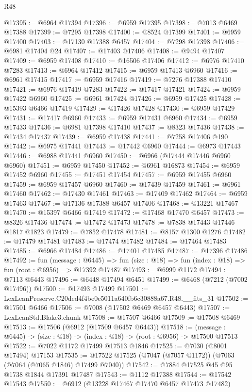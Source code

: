 \begin{lexlean}{R48}
\begin{coremodule}
@17395 := @6964 @17394
@17396 := @6959 @17395
@17398 := @7013 @6469 @17388
@17399 := @7295 @17398
@17400 := @8524 @17399
@17401 := @6959 @17400
@17403 := @17130 @17388 @6457
@17404 := @7298 @17398
@17406 := @6981 @17404 @24
@17407 := @17403 @17406
@17408 := @9494 @17407
@17409 := @6959 @17408
@17410 := @16506 @17406
@17412 := @6976 @17410 @7283
@17413 := @6964 @17412
@17415 := @6959 @17413 @6960
@17416 := @6961 @17415
@17417 := @6959 @17416
@17419 := @7276 @17388 @17410
@17421 := @6976 @17419 @7283
@17422 := @17417 @17421
@17424 := @6959 @17422 @6960
@17425 := @6961 @17424
@17426 := @6959 @17425
@17428 := @15393 @6466 @17419
@17429 := @17426 @17428
@17430 := @6959 @17429
@17431 := @17417 @6960
@17433 := @6959 @17431 @6960
@17434 := @6959 @17433
@17436 := @6981 @17398 @17410
@17437 := @8323 @17436
@17438 := @17434 @17437
@17439 := @6959 @17438
@17441 := @7258 @17406 @190
@17442 := @6975 @17441
@17443 := @17442 @6960
@17444 := @6973 @17443
@17446 := @6988 @17441 @6960
@17450 := @6966 (@17444 @17446 @6960 @6960)
@17451 := @6959 @17450
@17452 := @6961 @16873
@17454 := @6959 @17452 @6960
@17455 := @17451 @17454
@17457 := @6959 @17455 @6960
@17459 := @6959 @17457 @6960
@17460 := @17439 @17459
@17461 := @6961 @17460
@17462 := @17430 @17461
@17463 := @17409 @17462
@17464 := @6959 @17463
@17467 := @17136 @17388 @6457 @17406
@17468 := @13221 @17467
@17470 := @15397 @6466 @17419
@17472 := @17468 @17470 @6457
@17473 := @8326 @17436
@17474 := @17472 @17473
@17478 := @7838 @17443 @17446 @1817 @1823
@17479 := @7852 @17478
@17481 := @8157 @1300 @1276
@17482 := @17479 @17481
@17483 := @17474 @17482
@17484 := @17464 @17483
@17485 := @6966 @17484
@17486 := @17401 @17485
@17487 := @17396 @17486
@17492 := fun (message : @6445) =>
  fun (size : @18) => fun (index : @18) => fun (root : @6956) => @17392 @17487
@17493 := @6999 @1172
@17494 := @7113 @6443
@17496 := @6448 @17494 @6451
@17499 := @6468 (@7212 (@7002 @17496))
@17500 := @17493 @17499
@17501 := LexLeanPreserve.C20ded4f4be0e5011a640fb6c30888a67.R48.__fits_31
@17502 := @17501 @6466
@17506 := @7008 (@17502 @6469 @6457 @6443)
@17507 := LexLeanStd.Blake3.chunk
@17508 := @17507 @6466
@17509 := @17508 @6469
@17513 := @17506 (@6912 (@17509 @6457 @6443))
@17518 := (message : @6445) -> (size : @18) -> (index : @18) -> (root : @6956) -> @17500 @17513
@17522 := @7022 @1172 @17499 @17513 @1846
@17525 := @7030 (@8001 @17494) @17153
@17535 := @17522 @17525 (@7047 (@7057 @1172)) (@7063 (@7064 (@7065 @1846) @17499 @7040))
@17542 := @7884 @17525 @45 @95 @1738 @1844 @17391 @17487
@17543 := @1112 @17388
@17544 := @17542 @17543
@17550 := @6912 (@13228 @17467 @17470 @6457 @17473 @17482)

\end{coremodule}
\end{lexlean}
